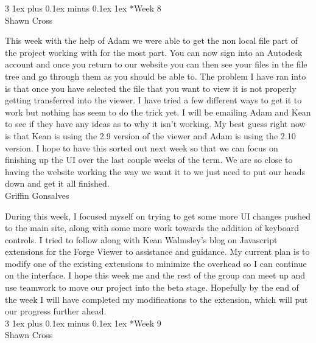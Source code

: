 \documentclass[letterpaper, 10pt, draftclsnofoot, compsoc, onecolumn]{IEEEtran}
\makeatletter
\def\subsubsection{\@startsection{subsubsection}%
                                 {3}%
                                 {\z@}%
                                 {1ex plus 0.1ex minus 0.1ex}%
                                 {1ex}%
                                 {\normalfont\normalsize}}%
\makeatother
\begin{document}
\subsubsection*{Week 8}\hspace*{\fill} \\
Shawn Cross

This week with the help of Adam we were able to get the non local file part of the project working with for the most part. You can now sign into an Autodesk account and once you return to our website you can then see your files in the file tree and go through them as you should be able to. The problem I have ran into is that once you have selected the file that you want to view it is not properly getting transferred into the viewer. I have tried a few different ways to get it to work but nothing has seem to do the trick yet. I will be emailing Adam and Kean to see if they have any ideas as to why it isn't working. My best guess right now is that Kean is using the 2.9 version of the viewer and Adam is using the 2.10 version. I hope to have this sorted out next week so that we can focus on finishing up the UI over the last couple weeks of the term. We are so close to having the website working the way we want it to we just need to put our heads down and get it all finished.\\

Griffin Gonsalves

During this week, I focused myself on trying to get some more UI changes pushed to the main site, along with some more work towards the addition of keyboard controls. I tried to follow along with Kean Walmsley's blog on Javascript extensions for the Forge Viewer to assistance and guidance. My current plan is to modify one of the existing extensions to minimize the overhead so I can continue on the interface. I hope this week me and the rest of the group can meet up and use teamwork to move our project into the beta stage. Hopefully by the end of the week I will have completed my modifications to the extension, which will put our progress further ahead.\\

\subsubsection*{Week 9}\hspace*{\fill} \\
Shawn Cross
\end{document}
